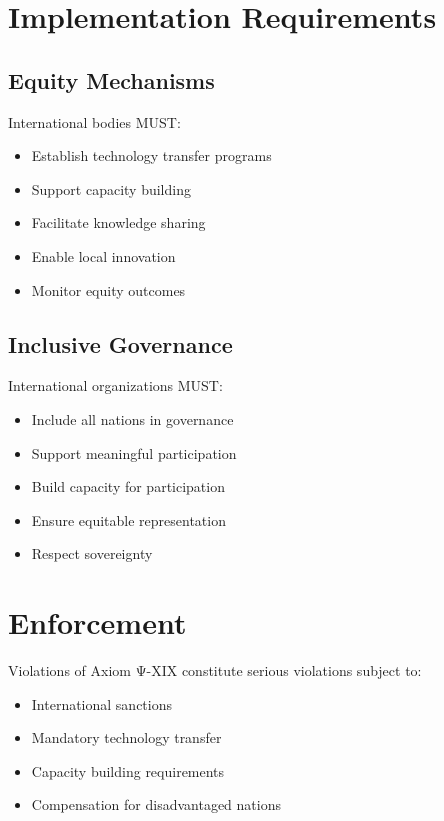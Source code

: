 \vspace{0.5cm}

\section{Implementation Requirements}

\subsection{Equity Mechanisms}

International bodies MUST:

\begin{itemize}
    \item Establish technology transfer programs
    \item Support capacity building
    \item Facilitate knowledge sharing
    \item Enable local innovation
    \item Monitor equity outcomes
\end{itemize}

\subsection{Inclusive Governance}

International organizations MUST:

\begin{itemize}
    \item Include all nations in governance
    \item Support meaningful participation
    \item Build capacity for participation
    \item Ensure equitable representation
    \item Respect sovereignty
\end{itemize}

\vspace{0.5cm}

\section{Enforcement}

Violations of Axiom Ψ-XIX constitute serious violations subject to:

\begin{itemize}
    \item International sanctions
    \item Mandatory technology transfer
    \item Capacity building requirements
    \item Compensation for disadvantaged nations
\end{itemize}

